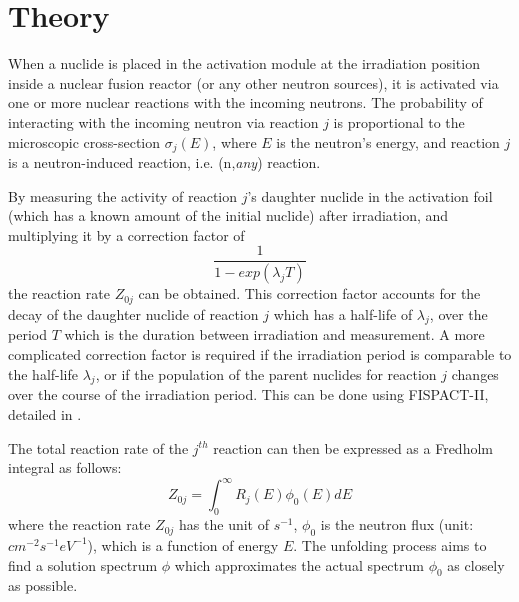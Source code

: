 \documentclass[a4paper, 12pt]{article}
\begin{document}
\section{Theory}
When a nuclide is placed in the activation module at the irradiation position inside a nuclear fusion reactor (or any other neutron sources), it is activated via one or more nuclear reactions with the incoming neutrons. The probability of interacting with the incoming neutron via reaction $j$ is proportional to the microscopic cross-section $\sigma_j (E)$, where $E$ is the neutron's energy, and reaction $j$ is a neutron-induced reaction, i.e. (n,\textit{any}) reaction.


By measuring the activity of reaction $j$'s daughter nuclide in the activation foil (which has a known amount of the initial nuclide) after irradiation, and multiplying it by a correction factor of 
\begin{equation}
    \frac{1}{{1-exp({\lambda_j}T)}}
\end{equation}
the reaction rate $Z_{0j}$ can be obtained. This correction factor accounts for the decay of the daughter nuclide of reaction $j$ which has a half-life of $\lambda_j$, over the period $T$ which is the duration between irradiation and measurement. A more complicated correction factor is required if the irradiation period is comparable to the half-life $\lambda_j$, or if the population of the parent nuclides for reaction $j$ changes over the course of the irradiation period. This can be done using FISPACT-II, detailed in \cite{LWP_LTIS}.

The total reaction rate of the $j^{th}$ reaction can then be expressed as a Fredholm integral as follows:
\begin{equation}
    Z_{0j}= \int_{0}^{\infty} R_{j}(E) \phi_0(E) {d}E
\end{equation}
where the reaction rate $Z_{0j}$ has the unit of $s^{-1}$,
$\phi_0$ is the neutron flux (unit: $cm^{-2} s^{-1} eV^{-1}$), which is a function of energy $E$. The unfolding process aims to find a solution spectrum $\phi$ which approximates the actual spectrum $\phi_0$ as closely as possible. 
\end{document}
